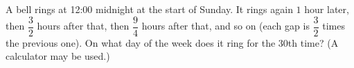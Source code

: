 A bell rings at 12:00 midnight at the start of Sunday. It rings again $1$ hour later, then $\dfrac32$ hours after that, then $\dfrac94$ hours after that, and so on (each gap is $\dfrac32$ times the previous one). On what day of the week does it ring for the $30$th time? (A calculator may be used.)
